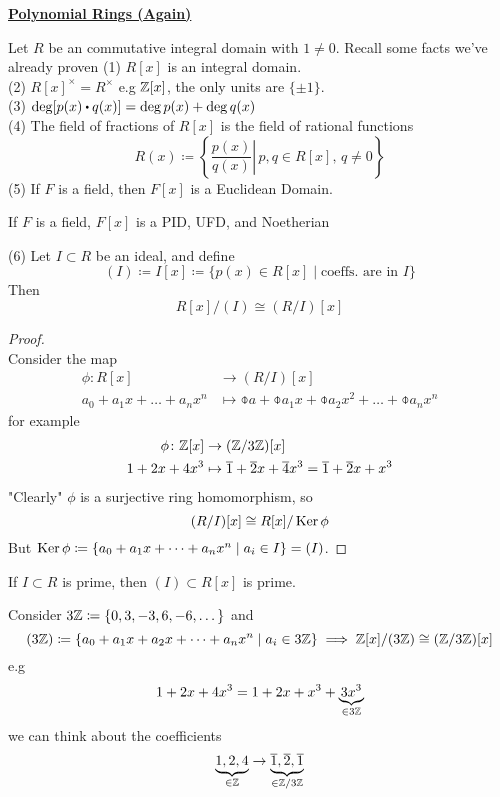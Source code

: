\documentclass[../Main.tex]{subfiles}
\begin{document}
\newpage
\underline{\textbf{\Large Polynomial Rings (Again)}}

Let $R$ be an commutative integral domain with $1\ne 0$. Recall some facts we've already proven
(1) $R[x]$ is an integral domain.\\
(2) $R[x]^\times=R^\times$ e.g $\mathbb{Z}[x]$, the only units are $\{\pm 1\}$.\\
(3) $\deg[p(x)\rdot q(x)]=\deg p(x)+ \deg q(x)$\\
(4) The field of fractions of $R[x]$ is the field of rational functions
	\[R(x)\coloneqq \left\{ \left. \frac{p(x)}{q(x)} \right| \, p,q\in R[x],\, q\ne 0\right\}\]
(5) If $F$ is a field, then $F[x]$ is a Euclidean Domain.
	\begin{crl}
		If $F$ is a field, $F[x]$ is a PID, UFD, and Noetherian
	\end{crl}
(6) Let $I\subset R$ be an ideal, and define
	\[(I)\coloneqq I[x] \coloneqq \{p(x)\in R[x]\mid \text{coeffs. are in } I\}\]
	Then 
	\[R[x]/(I)\cong (R/I)[x]\]
\begin{proof}~\\
	Consider the map
	\begin{align*}
	\phi\colon R[x] &\to (R/I)[x] \\
	a_0+a_1x+\dots+a_nx^n &\mapsto \obar{a}+\obar{a_1}x+\obar{a_2}x^2+\dots+\obar{a_n}x^n
	\end{align*}
	for example
	\begin{align*}
	\phi\colon \mathbb{Z}[x] &\to (\mathbb{Z}/3\mathbb{Z})[x] \\
	1+2x+4x^3 &\mapsto \overline{1}+\overline{2}x+\overline{4}x^3=\overline{1}+\overline{2}x+x^3
	\end{align*}
	"Clearly" $\phi$ is a surjective ring homomorphism, so
	\[(R/I)[x]\cong R[x]/\operatorname{Ker} \phi\]
	But $\operatorname{Ker}\phi\coloneqq\{a_0+a_1x+\dots+a_nx^n\mid a_i\in I\}=(I)$.
\end{proof}
\begin{crl}
		If $I\subset R$ is prime, then $(I)\subset R[x]$ is prime.
\end{crl}
\begin{example}
	Consider $3\mathbb{Z} \coloneqq \{0,3,-3,6,-6,\dots\}$ and
	\[(3\mathbb{Z})\coloneqq \{a_0+a_1x+a_2x+\dots+a_nx^n\mid a_i\in 3\mathbb{Z}\} \implies \mathbb{Z}[x]/(3\mathbb{Z})\cong (\mathbb{Z}/3\mathbb{Z})[x]\]
	e.g 
	\[1+2x+4x^3=1+2x+x^3+\underbrace{3x^3}_{\in 3\mathbb{Z}}\]
	we can think about the coefficients
	\[\underbrace{1,2,4}_{\in \mathbb{Z}}\to \underbrace{\overline{1},\overline{2},\overline{1}}_{\in \mathbb{Z}/3\mathbb{Z}}\]
\end{example}
\end{document}
